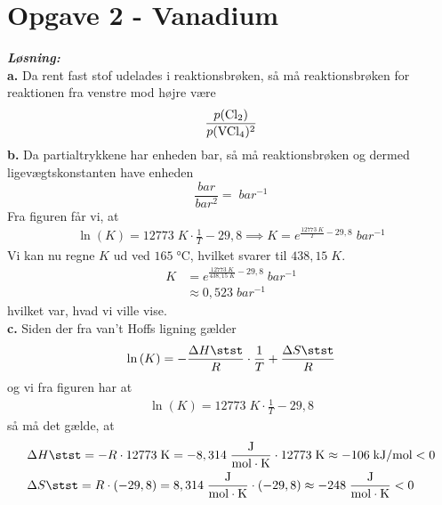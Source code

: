 \documentclass{report}
\newcommand{\sol}{\setlength{\parindent}{0cm}\textbf{\textit{Løsning:}}\setlength{\parindent}{1cm}}
\begin{document}
\section*{Opgave 2 - Vanadium}
\sol \\
\textbf{a.}
Da rent fast stof udelades i reaktionsbrøken, så må reaktionsbrøken for reaktionen fra venstre mod højre være
\[
\frac{p(\ce{Cl2} )}{p(\ce{VCl4} )^2}
\] 
\textbf{b.}
Da partialtrykkene har enheden bar, så må reaktionsbrøken og dermed ligevægtskonstanten have enheden
\[
\frac{\unit{bar}}{\unit{bar^2}}= \;\unit{bar^{-1}} 
\] 
Fra figuren får vi, at 
\begin{equation*}
\begin{split}
  \ln\left(K\right) =12773 \;\unit{K} \cdot \frac{1}{T}-29,8 \implies K= e^{\frac{12773 \;\unit{K}}{T}-29,8 } \;\unit{bar^{-1}} 
\end{split}
\end{equation*}
Vi kan nu regne $K$ ud ved $165 \;\unit{\celsius} $, hvilket svarer til $438,15 \;\unit{K} $. 
\begin{equation*}
\begin{split}
  K&= e^{\frac{12773 \;\unit{K}}{438,15 \;\unit{K} }-29,8 } \;\unit{bar^{-1}} \\
  &\approx 0,523 \;\unit{bar^{-1}} 
\end{split}
\end{equation*}
hvilket var, hvad vi ville vise. \\[1ex]
\textbf{c.}
Siden der fra van't Hoffs ligning gælder
\begin{equation*}
\begin{split}
  \ln\left(K\right) = - \frac{\Delta H \stst }{R}\cdot \frac{1}{T} + \frac{\Delta S \stst }{R}
\end{split}
\end{equation*}
og vi fra figuren har at
\begin{equation*}
\begin{split}
\ln\left(K\right) =12773 \;\unit{K} \cdot \frac{1}{T}-29,8 
\end{split}
\end{equation*}
så må det gælde, at
\begin{equation*}
\begin{split}
  &\Delta H \stst = -R \cdot 12773 \;\unit{K} =-8,314 \;\unit{\frac{J}{mol \cdot K}} \cdot 12773 \;\unit{K} \approx -106 \;\unit{kJ/mol} <0 \\
  &\Delta S \stst = R \cdot \left(-29,8\right) =8,314 \;\unit{\frac{J}{mol \cdot K}} \cdot \left(-29,8\right) \approx -248 \;\unit{\frac{J}{mol \cdot K}} <0
\end{split}
\end{equation*}
\end{document}
